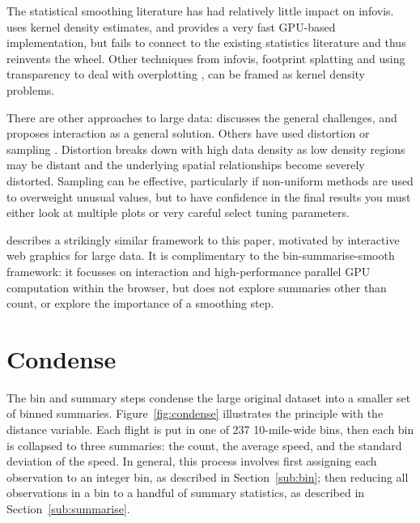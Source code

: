 \documentclass[journal]{vgtc}                %
\begin{document}
The statistical smoothing literature has had relatively little impact on infovis. \citep{lampe:2011} uses kernel density estimates, and provides a very fast GPU-based implementation, but fails to connect to the existing statistics literature and thus reinvents the wheel. Other techniques from infovis, footprint splatting \citep{becker:1997,yang:2003} and using transparency to deal with overplotting \citep{johansson:2005,unwin:2006}, can be framed as kernel density problems.

There are other approaches to large data: \citep{heer:2012} discusses the general challenges, and proposes interaction as a general solution. Others have used distortion \citep{keim:2010} or sampling \citep{wegman:1995, bertini:2006a}. Distortion breaks down with high data density as low density regions may be distant and the underlying spatial relationships become severely distorted. Sampling can be effective, particularly if non-uniform methods are used to overweight unusual values, but to have confidence in the final results you must either look at multiple plots or very careful select tuning parameters.

\citep{liu:2013} describes a strikingly similar framework to this paper, motivated by interactive web graphics for large data. It is complimentary to the bin-summarise-smooth framework: it focusses on interaction and high-performance parallel GPU computation within the browser, but does not explore summaries other than count, or explore the importance of a smoothing step. 

\section{Condense}
\label{sec:condense}

The bin and summary steps condense the large original dataset into a smaller set of binned summaries. Figure~\ref{fig:condense} illustrates the principle with the distance variable. Each flight is put in one of 237 10-mile-wide bins, then each bin is collapsed to three summaries: the count, the average speed, and the standard deviation of the speed. In general, this process involves first assigning each observation to an integer bin, as described in Section~\ref{sub:bin}; then reducing all observations in a bin to a handful of summary statistics, as described in Section~\ref{sub:summarise}.
\end{document}
